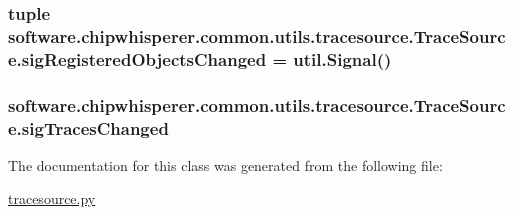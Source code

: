 \subsubsection[{sig\+Registered\+Objects\+Changed}]{\setlength{\rightskip}{0pt plus 5cm}tuple software.\+chipwhisperer.\+common.\+utils.\+tracesource.\+Trace\+Source.\+sig\+Registered\+Objects\+Changed = {\bf util.\+Signal}()\hspace{0.3cm}{\ttfamily [static]}}\label{classsoftware_1_1chipwhisperer_1_1common_1_1utils_1_1tracesource_1_1TraceSource_ab3d2b78b82dd89170071845840b4f1a6}
\hypertarget{classsoftware_1_1chipwhisperer_1_1common_1_1utils_1_1tracesource_1_1TraceSource_ab0c62f8fad1e457c72d44e62a542f3e9}{}
\subsubsection[{sig\+Traces\+Changed}]{\setlength{\rightskip}{0pt plus 5cm}software.\+chipwhisperer.\+common.\+utils.\+tracesource.\+Trace\+Source.\+sig\+Traces\+Changed}\label{classsoftware_1_1chipwhisperer_1_1common_1_1utils_1_1tracesource_1_1TraceSource_ab0c62f8fad1e457c72d44e62a542f3e9}


The documentation for this class was generated from the following file\+:\begin{DoxyCompactItemize}
\item 
\hyperlink{tracesource_8py}{tracesource.\+py}\end{DoxyCompactItemize}

